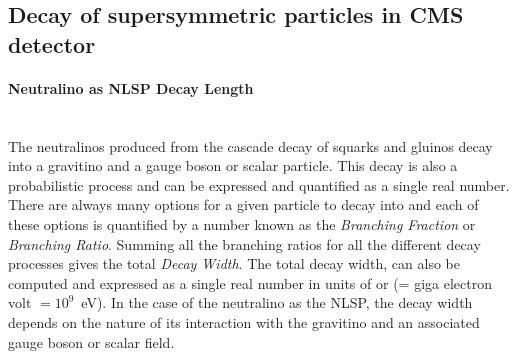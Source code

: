 {%
\subsection{Decay of supersymmetric particles in CMS detector}
\paragraph{Neutralino as NLSP Decay Length}\mbox{}\\
The neutralinos produced from the cascade decay of squarks and gluinos decay into a gravitino and a gauge boson or scalar particle. This decay is also a probabilistic process and can be expressed and quantified as a single real number. 
 There are always many options for a given particle to decay into and each of these options is quantified by a number known as the \textit{Branching  Fraction} or \textit{Branching Ratio}. Summing all the branching ratios for all the different decay processes gives the total \textit{Decay Width}. The total decay width, can also be computed and expressed as a single real number in units of \GeV or \MeV (\GeV = giga electron volt $=10^{9}$~eV). In the case of the neutralino as the NLSP, the decay width depends on the nature of its interaction with the gravitino and an associated gauge boson or scalar field.
}
